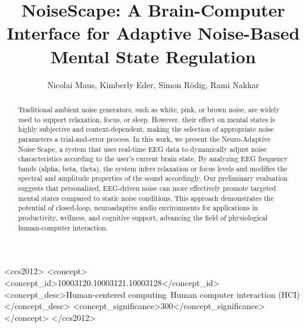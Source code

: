 \documentclass[sigconf, nonacm, screen=True, review=True, anonymous=False, authordraft=False]{acmart}
\begin{document}
\title{NoiseScape: A Brain-Computer Interface for Adaptive Noise-Based Mental State Regulation}

\author{Nicolai Maus, Kimberly Eder, Simon Rödig, Rami Nakkar}

\begin{abstract}
Traditional ambient noise generators, such as white, pink, or brown noise, are widely used to support relaxation, focus, or sleep. However, their effect on mental states is highly subjective and context-dependent, making the selection of appropriate noise parameters a trial-and-error process. In this work, we present the Neuro-Adaptive Noise Scape, a system that uses real-time EEG data to dynamically adjust noise characteristics according to the user’s current brain state. By analyzing EEG frequency bands (alpha, beta, theta), the system infers relaxation or focus levels and modifies the spectral and amplitude properties of the sound accordingly. Our preliminary evaluation suggests that personalized, EEG-driven noise can more effectively promote targeted mental states compared to static noise conditions. This approach demonstrates the potential of closed-loop, neuroadaptive audio environments for applications in productivity, wellness, and cognitive support, advancing the field of physiological human-computer interaction.
\end{abstract}


\begin{CCSXML}
<ccs2012>
    <concept>
        <concept_id>10003120.10003121.10003128</concept_id>
        <concept_desc>Human-centered computing~Human computer interaction (HCI)</concept_desc>
        <concept_significance>300</concept_significance>
    </concept>
 </ccs2012>
\end{CCSXML}


\end{document}
